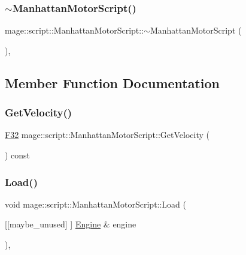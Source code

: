 \subsubsection{\texorpdfstring{$\sim$\+Manhattan\+Motor\+Script()}{~ManhattanMotorScript()}}
{\footnotesize\ttfamily mage\+::script\+::\+Manhattan\+Motor\+Script\+::$\sim$\+Manhattan\+Motor\+Script (\begin{DoxyParamCaption}{ }\end{DoxyParamCaption})\hspace{0.3cm}{\ttfamily [virtual]}, {\ttfamily [default]}}



\subsection{Member Function Documentation}
\mbox{\label{classmage_1_1script_1_1_manhattan_motor_script_a2f73545bf2fb507375251d530054ac9b}} 
\subsubsection{\texorpdfstring{Get\+Velocity()}{GetVelocity()}}
{\footnotesize\ttfamily \mbox{\hyperlink{namespacemage_aa97e833b45f06d60a0a9c4fc22ae02c0}{F32}} mage\+::script\+::\+Manhattan\+Motor\+Script\+::\+Get\+Velocity (\begin{DoxyParamCaption}{ }\end{DoxyParamCaption}) const\hspace{0.3cm}{\ttfamily [noexcept]}}

\mbox{\label{classmage_1_1script_1_1_manhattan_motor_script_ac93b09e8f82932f7071b1f591a8004e9}} 
\subsubsection{\texorpdfstring{Load()}{Load()}}
{\footnotesize\ttfamily void mage\+::script\+::\+Manhattan\+Motor\+Script\+::\+Load (\begin{DoxyParamCaption}\item[{\mbox{[}\mbox{[}maybe\+\_\+unused\mbox{]} \mbox{]} \mbox{\hyperlink{classmage_1_1_engine}{Engine}} \&}]{engine }\end{DoxyParamCaption})\hspace{0.3cm}{\ttfamily [override]}, {\ttfamily [virtual]}}

